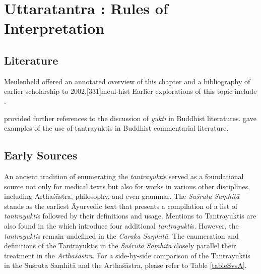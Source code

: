 
\chapter{Uttaratantra :  Rules of Interpretation}

\section{Literature} 

Meulenbeld offered an annotated overview of this chapter and a bibliography
of earlier scholarship to 2002.[331]{meul-hist}  Earlier explorations 
of this topic include \cite{dasg-1952,
lele-1981,
mejo-2000,
nara-1949,
ober-1967,
scha-1993,
sing-2003,
muth-1976}. 


\citet[105--106, fn.\,109]{prei-2013} provided further references to the
discussion of \emph{yukti} in Buddhist literatures. \citet{mane-2008}
gave examples of the use of tantrayuktis in Buddhist commentarial
literature.


\section{Early Sources}

An ancient tradition of enumerating the \textit{tantrayukti}s served as a foundational source not only for medical texts but also for works in various other disciplines, including Arthaśāstra, philosophy, and even grammar. The \textit{Suśruta Saṃhitā} stands as the earliest Āyurvedic text that presents a compilation of a list of \textit{tantrayukti}s followed by their definitions and usage. Mentions to Tantrayuktis are also found in the  which introduce four additional \textit{tantrayukti}s. However, the \textit{tantrayukti}s remain undefined in the \textit{Caraka Saṃhitā}. The enumeration and definitions of the Tantrayuktis in the \textit{Suśruta Saṃhitā} closely parallel their treatment in the \textit{Arthaśāstra}. For a side-by-side comparison of the Tantrayuktis in the Suśruta Saṃhitā and the Arthaśāstra, please refer to Table \ref{tableSvsA}.

